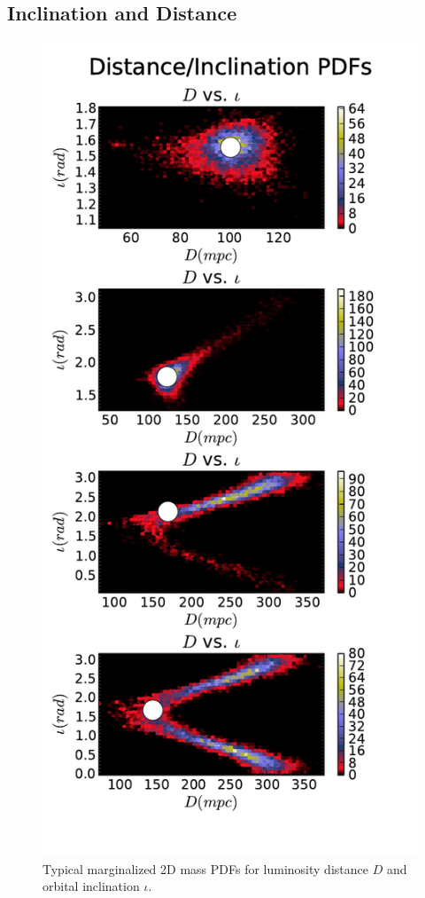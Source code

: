 \documentclass[11pt,a4paper]{emulateapj}
\begin{document}
\subsection{Inclination and Distance}
\label{idSection}

   
\begin{figure}[h!]
  \centering
 \includegraphics[trim=0cm 0cm 0cm 0cm, clip=true,scale=0.8]{distIota2D.pdf}
 \caption{Typical marginalized 2D mass PDFs for luminosity distance $D$ and orbital inclination $\iota$. }
 \label{distIotaPDF}
\end{figure}
\end{document}
